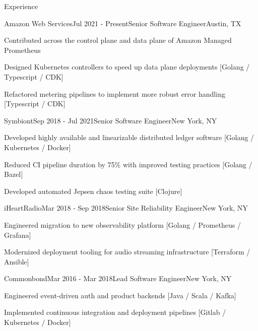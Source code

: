 \documentclass{resume} %
\begin{document}
\begin{rSection}{Experience}

\begin{rSubsection}{Amazon Web Services}{Jul 2021 - Present}{Senior Software Engineer}{Austin, TX}
\item Contributed across the control plane and data plane of Amazon Managed Prometheus
\item Designed Kubernetes controllers to speed up data plane deployments {\footnotesize [Golang / Typescript / CDK]}
\item Refactored metering pipelines to implement more robust error handling {\footnotesize [Typescript / CDK]}

\end{rSubsection}

\begin{rSubsection}{Symbiont}{Sep 2018 - Jul 2021}{Senior Software Engineer}{New York, NY}
\item Developed highly available and linearizable distributed ledger software {\footnotesize [Golang / Kubernetes / Docker]}
\item Reduced CI pipeline duration by 75\% with improved testing practices {\footnotesize [Golang / Bazel]}
\item Developed automated Jepsen chaos testing suite {\footnotesize [Clojure]}

\end{rSubsection}


\begin{rSubsection}{iHeartRadio}{Mar 2018 - Sep 2018}{Senior Site Reliability Engineer}{New York, NY}
\item Engineered migration to new observability platform {\footnotesize [Golang / Prometheus / Grafana]}
\item Modernized deployment tooling for audio streaming infrastructure {\footnotesize [Terraform / Ansible]}

\end{rSubsection}


\begin{rSubsection}{Commonbond}{Mar 2016 - Mar 2018}{Lead Software Engineer}{New York, NY}
\item Engineered event-driven auth and product backends {\footnotesize [Java / Scala / Kafka]}
\item Implemented continuous integration and deployment pipelines {\footnotesize [Gitlab / Kubernetes / Docker]}


\end{rSubsection}
\end{rSection}
\end{document}
